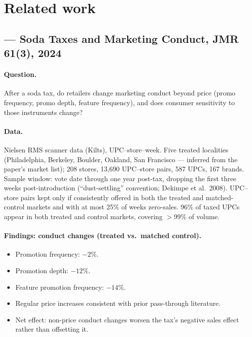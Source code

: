 
\section*{Related work}

\subsection*{\citet{keller_guyt_grewal_soda_marketing_conduct}
  --- Soda Taxes and Marketing Conduct, JMR 61(3), 2024}

\paragraph{Question.} After a soda tax, do retailers change
marketing conduct beyond price (promo frequency, promo depth,
feature frequency), and does consumer sensitivity to those
instruments change?

\paragraph{Data.} Nielsen RMS scanner data (Kilts), UPC--store--week.
Five treated localities (Philadelphia, Berkeley, Boulder,
Oakland, San Francisco --- inferred from the paper's market
list); 208 stores, 13{,}690 UPC--store pairs, 587 UPCs, 167
brands. Sample window: vote date through one year post-tax,
dropping the first three weeks post-introduction
(``dust-settling'' convention; Dekimpe et al.\ 2008).
UPC--store pairs kept only if consistently offered in both the
treated and matched-control markets and with at most 25\% of
weeks zero-sales. 96\% of taxed UPCs appear in both treated
and control markets, covering $>$99\% of volume.

\paragraph{Findings: conduct changes (treated vs.\ matched control).}
\begin{itemize}
  \item Promotion frequency: $-2\%$.
  \item Promotion depth: $-12\%$.
  \item Feature promotion frequency: $-14\%$.
  \item Regular price increases consistent with prior pass-through
        literature.
  \item Net effect: non-price conduct changes worsen the tax's
        negative sales effect rather than offsetting it.
\end{itemize}


